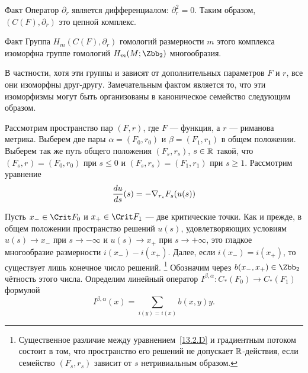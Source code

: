 \begin{thm}{Факт}\label{13.2.B}
  Оператор $\partial_{r}$ является дифференциалом: $\partial_{r}^{2}=0$.
  Таким образом, $(C(F),\partial_{r})$ это цепной комплекс. 
\end{thm}

\begin{thm}{Факт}\label{13.2.C}
  Группа $H_{m}(C(F),\partial_{r})$ гомологий размерности $m$ этого
  комплекса изоморфна группе гомологий $H_{m}(M; \Zbb_{2})$ многообразия.
\end{thm}

В частности, хотя эти группы и зависят от дополнительных параметров
$F$ и $r$, все они изоморфны друг-другу.
Замечательным фактом является то, что эти изоморфизмы могут быть
организованы в каноническое семейство следующим образом.

Рассмотрим пространство пар $(F, r)$, где $F$ --- функция, а $r$ ---
риманова метрика. 
Выберем две пары $\alpha = (F_{0}, r_{0})$ и
$\beta = (F_{1},r_{1})$ в общем положении. Выберем так же путь общего положения
$(F_{s},r_{s})$, $s\in\mathbb{R}$ такой, что
$(F_{s}, r_{}) = (F_{0}, r_{0})$ при $s\le0$ и
$(F_{s}, r_{s}) = (F_{1},r_{1})$ при $s\ge1$.
Рассмотрим уравнение
\begin{equation}\label{13.2.D}
  \frac{d u}{d s}(s)=-\nabla_{r_{s}}F_{s}(u(s))
\end{equation}

Пусть $x_{-}\in\Crit F_{0}$ и $x_{+}\in\Crit F_{1}$ --- две критические точки.
Как и прежде, в общем положении пространство решений $u(s)$,
удовлетворяющих условиям $u(s)\to x_{-}$ при $s\to-\infty$ и $u(s)\to
x_{+}$ при  $s\to+\infty$, это гладкое многообразие размерности
$i(x_{-})-i(x_{+})$.
Далее, если $i(x_{-}) = i(x_{+})$, то существует лишь конечное число
решений.%
\footnote{Существенное различие между уравнением~\ref{13.2.D} и
  градиентным потоком состоит в том, что пространство его решений
  не допускает $\mathbb{R}$-действия, если семейство $(F_{s},r_{s})$ зависит
  от $s$ нетривиальным образом.}
Обозначим через $b(x_{-},x_{+})\in\Zbb_{2}$ чётность этого числа.
Определим линейный оператор
$I^{\beta,\alpha} : C_{*}(F_{0})\to C_{*}(F_{1})$ формулой
\[
I^{\beta,\alpha}(x) = \sum_{i(y)=i(x)}b(x, y)y.
\]

